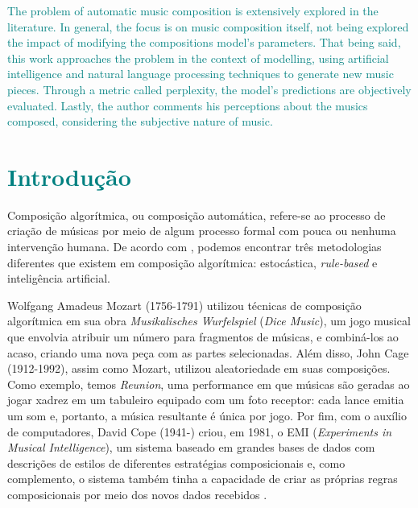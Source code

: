 \documentclass{automatextcc}
\newcommand{\nico}[1]{\textcolor{teal}{#1}}
\begin{document}
\begin{englishabstract}
\nico{
The problem of automatic music composition is extensively explored in the literature. In general, the focus is on music composition itself, not being explored the impact of modifying the compositions model's parameters. That being said, this work approaches the problem in the context of modelling, using artificial intelligence and natural language processing techniques to generate new music pieces. Through a metric called perplexity, the model's predictions are objectively evaluated. Lastly, the author comments his perceptions about the musics composed, considering the subjective nature of music.
}
\end{englishabstract}

\tableofcontents

\listoffigures

\listoftables



\chapter{\nico{Introdução}}
Composição algorítmica, ou composição automática, refere-se ao processo de criação de músicas por meio de algum processo formal com pouca ou nenhuma intervenção humana. De acordo com \citet{maurer}, podemos encontrar três metodologias diferentes que existem em composição algorítmica: estocástica, \textit{rule-based} e inteligência artificial.

Wolfgang Amadeus Mozart (1756-1791) utilizou técnicas de composição algorítmica em sua obra \textit{Musikalisches Wurfelspiel} (\textit{Dice Music}), um jogo musical que envolvia atribuir um número para fragmentos de músicas, e combiná-los ao acaso, criando uma nova peça com as partes selecionadas. Além disso, John Cage (1912-1992), assim como Mozart, utilizou aleatoriedade em suas composições. Como exemplo, temos \textit{Reunion}, uma performance em que músicas são geradas ao jogar xadrez em um tabuleiro equipado com um foto receptor: cada lance emitia um som e, portanto, a música resultante é única por jogo. Por fim, com o auxílio de computadores, David Cope (1941-) criou, em 1981, o EMI (\textit{Experiments in Musical Intelligence}), um sistema baseado em grandes bases de dados com descrições de estilos de diferentes estratégias composicionais e, como complemento, o sistema também tinha a capacidade de criar as próprias regras composicionais por meio dos novos dados recebidos \citep{alpern1995, maurer}. 
\end{document}
